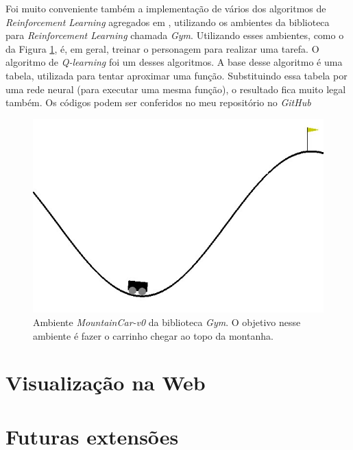 \documentclass{article}
\begin{document}
        Foi muito conveniente também a implementação de vários dos 
        algoritmos de \textit{Reinforcement Learning} agregados em
        , utilizando os ambientes da biblioteca para \textit{Reinforcement Learning} chamada \textit{Gym}.
        Utilizando esses ambientes, como o da Figura \ref{fig:mountaincar-v0}, é, em geral, treinar
        o personagem para realizar uma tarefa.
        O algoritmo de \textit{Q-learning} foi um desses algoritmos.
        A base desse algoritmo é uma tabela,
        utilizada para tentar aproximar uma função. Substituindo essa tabela por
        uma rede neural (para executar uma mesma função), o resultado fica muito
        legal também. Os códigos podem ser conferidos no meu repositório no \textit{GitHub}

        \begin{figure}[h!]
            \centering
            \includegraphics[width=\textwidth]{mountaincar_v0.jpg}
            \caption{Ambiente \textit{MountainCar-v0} da biblioteca \textit{Gym}.
            O objetivo nesse ambiente é fazer o carrinho chegar ao topo da montanha.}
            \label{fig:mountaincar-v0}
        \end{figure}

    \section{Visualização na Web}

    \section{Futuras extensões}

    
    
\end{document}
